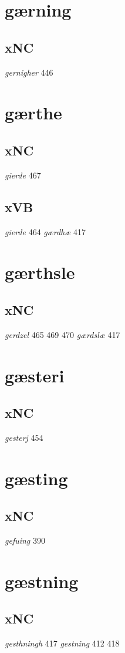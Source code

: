 \documentclass[a4paper,twocolumn]{article}
\begin{document}
\section{gærning}
\label{sec:org76fe47c}
\subsection{xNC}
\label{sec:orgae3a628}
\emph{gernigher} 446 
\section{gærthe}
\label{sec:orge5cd637}
\subsection{xNC}
\label{sec:orgc082b5a}
\emph{gierde} 467 
\subsection{xVB}
\label{sec:org1816da3}
\emph{gierde} 464 \emph{gærdhæ} 417 
\section{gærthsle}
\label{sec:org4a6b2e4}
\subsection{xNC}
\label{sec:org365ad95}
\emph{gerdzel} 465 469 470 \emph{gærdslæ} 417 
\section{gæsteri}
\label{sec:org260b2f9}
\subsection{xNC}
\label{sec:org54b0e3f}
\emph{gesterj} 454 
\section{gæsting}
\label{sec:org0e98c2e}
\subsection{xNC}
\label{sec:orgac4a893}
\emph{gefuing} 390 
\section{gæstning}
\label{sec:orgac0f966}
\subsection{xNC}
\label{sec:org91aba4f}
\emph{gesthningh} 417 \emph{gestning} 412 418 
\end{document}
